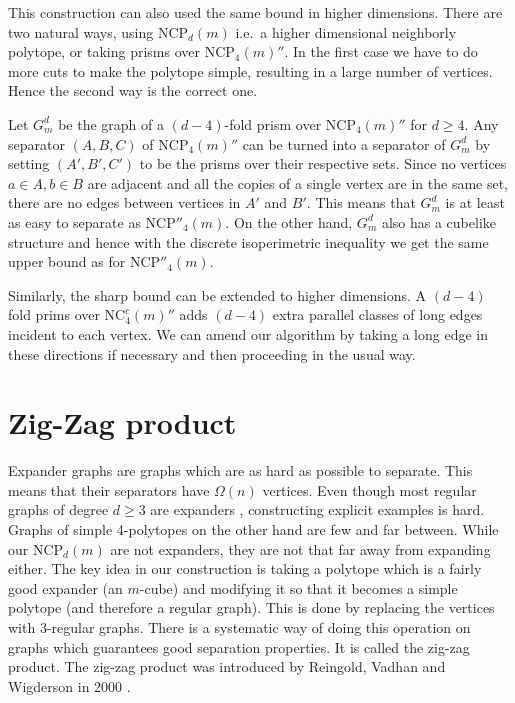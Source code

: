 \documentclass[a4paper,12pt]{book}
\theoremstyle{plain}
\theoremstyle{definition}
\newcommand\NC{\textrm{NCP}}
\newcommand\NCC{\mathrm{NC}^c}
\begin{document}
This construction can also used the same bound in higher dimensions. There are two 
natural ways, using $\NC_d(m)$ i.e.\ a higher dimensional neighborly polytope, or 
taking prisms over $\NC_4(m)''$.  In the first case we have to do more cuts to 
make the polytope simple, resulting in a large number of vertices. Hence the 
second way is the correct one. 

Let $G^d_m$ be the graph of a $(d-4)$-fold prism over $\NC_4(m)''$ for $d\geq 4$. 
Any separator 
$(A,B,C)$ of $\NC_4(m)''$ can be turned into a separator of $G^d_m$ by setting 
$(A',B',C')$ to be the prisms over their respective sets. Since no vertices 
$a\in A, b\in B$ are adjacent and all the copies of a single vertex are in the 
same set, there are no edges between vertices in $A'$ and $B'$. This means that 
$G^d_m$ is at least as easy to separate as $\NC''_4(m)$. On the other hand, $G^d_m$ 
also has a cubelike structure and hence with the discrete isoperimetric 
inequality we get the same upper bound as for $\NC''_4(m)$. 

Similarly, the sharp bound can be extended to higher dimensions. A $(d-4)$ fold
prims over $\NCC_4(m)''$ adds $(d-4)$ extra parallel classes of long edges incident
to each vertex. We can amend our algorithm by taking a long edge in these directions 
if necessary and then proceeding in the usual way.

\section{Zig-Zag product}

Expander graphs are graphs which are as hard as possible to separate. This means that their
separators have $\Omega(n)$ vertices.
Even though most regular graphs of degree $d\ge 3$ are expanders \cite{KoBa1967}, 
constructing explicit examples is hard. Graphs of simple 4-polytopes on the other hand
are few and far between. While our $\NC_d(m)$ are not expanders, they are not that  
far away from expanding either. The key idea in our construction is taking a polytope which
is a fairly good expander (an $m$-cube)
and modifying it so that it becomes a simple polytope (and therefore a regular graph). This
is done by replacing the vertices with 3-regular graphs. There is a systematic way of doing this operation
on graphs which guarantees good separation properties. It is called
the zig-zag product. The zig-zag product was introduced by Reingold, Vadhan and Wigderson in 2000 
\cite{892006}. 
\end{document}
